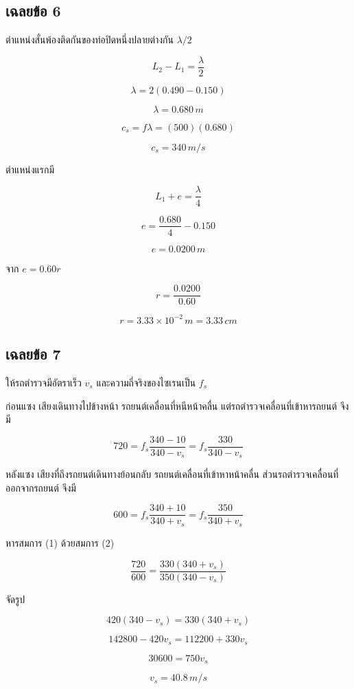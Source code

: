 \subsection*{เฉลยข้อ 6}

ตำแหน่งสั่นพ้องติดกันของท่อปิดหนึ่งปลายต่างกัน $\lambda/2$

\[
L_2-L_1=\frac{\lambda}{2}
\]

\[
\lambda=2(0.490-0.150)
\]

\[
\boxed{\lambda=0.680\,\si{m}}
\]

\[
c_s=f\lambda=(500)(0.680)
\]

\[
\boxed{c_s=340\,\si{m/s}}
\]

ตำแหน่งแรกมี

\[
L_1+e=\frac{\lambda}{4}
\]

\[
e=\frac{0.680}{4}-0.150
\]

\[
\boxed{e=0.0200\,\si{m}}
\]

จาก $e=0.60r$

\[
r=\frac{0.0200}{0.60}
\]

\[
\boxed{r=3.33\times10^{-2}\,\si{m}=3.33\,\si{cm}}
\]

\subsection*{เฉลยข้อ 7}

ให้รถตำรวจมีอัตราเร็ว $v_s$ และความถี่จริงของไซเรนเป็น $f_s$

ก่อนแซง เสียงเดินทางไปข้างหน้า รถยนต์เคลื่อนที่หนีหน้าคลื่น แต่รถตำรวจเคลื่อนที่เข้าหารถยนต์ จึงมี

\[
720
=f_s\frac{340-10}{340-v_s}
=f_s\frac{330}{340-v_s}
\tag{1}
\]

หลังแซง เสียงที่ถึงรถยนต์เดินทางย้อนกลับ รถยนต์เคลื่อนที่เข้าหาหน้าคลื่น ส่วนรถตำรวจเคลื่อนที่ออกจากรถยนต์ จึงมี

\[
600
=f_s\frac{340+10}{340+v_s}
=f_s\frac{350}{340+v_s}
\tag{2}
\]

หารสมการ (1) ด้วยสมการ (2)

\[
\frac{720}{600}
=\frac{330(340+v_s)}{350(340-v_s)}
\]

จัดรูป

\[
420(340-v_s)=330(340+v_s)
\]

\[
142800-420v_s=112200+330v_s
\]

\[
30600=750v_s
\]

\[
\boxed{v_s=40.8\,\si{m/s}}
\]

